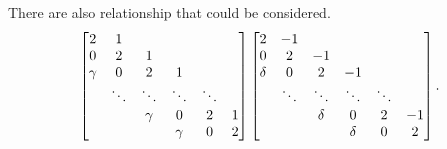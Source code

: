 There are also relationship that could be considered.
\begin{equation}
\begin{bmatrix}
	2 & 1& & & & \\
	0& 2& 1& & & \\
	\gamma&0 & 2& 1& & \\
	& \ddots&\ddots & \ddots& \ddots& \\
	& & \gamma&0 & 2& 1\\
	& & & \gamma& 0& 2
\end{bmatrix}
\begin{bmatrix}
	2 & -1& & & & \\
	0& 2& -1& & & \\
	\delta&0 & 2& -1& & \\
	& \ddots&\ddots & \ddots& \ddots& \\
	& & \delta&0 & 2& -1\\
	& & & \delta& 0& 2
\end{bmatrix}
.
\end{equation}

